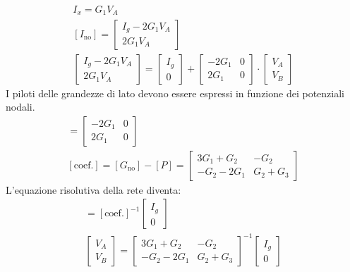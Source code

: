 \documentclass{article}
\numberwithin{equation}{subsection}
\begin{document}
\begin{gather*}
    I_x=G_1V_A\\
    [I_\mathrm{no}]=\begin{bmatrix}
        I_g-2G_1V_A\\
        2G_1V_A
    \end{bmatrix}\\
    \begin{bmatrix}
        I_g-2G_1V_A\\
        2G_1V_A    
    \end{bmatrix}=
    \begin{bmatrix}
        I_g\\
        0
    \end{bmatrix}+\begin{bmatrix}
        -2G_1&0\\
        2G_1&0
    \end{bmatrix}\cdot\begin{bmatrix}
        V_A\\
        V_B
    \end{bmatrix}
\end{gather*}
I piloti delle grandezze di lato devono essere espressi in funzione dei potenziali nodali. 
\begin{gather*}
    [P]=\begin{bmatrix}
        -2G_1&0\\
        2G_1&0
    \end{bmatrix}\\
    [{\mathrm{coef.}}]=[G_\mathrm{no}]-[P]=\begin{bmatrix}
        3G_1+G_2&-G_2\\
        -G_2-2G_1&G_2+G_3
    \end{bmatrix}
\end{gather*}
L'equazione risolutiva della rete diventa:
\begin{gather*}
    [V_\mathrm{no}]=[\mathrm{coef.}]^{-1}\begin{bmatrix}
        I_g\\
        0
    \end{bmatrix}\\
    \begin{bmatrix}
        V_A\\
        V_B
    \end{bmatrix}=
    \begin{bmatrix}
        3G_1+G_2&-G_2\\
        -G_2-2G_1&G_2+G_3
    \end{bmatrix}^{-1}\begin{bmatrix}
        I_g\\
        0
    \end{bmatrix}
\end{gather*}
\end{document}

